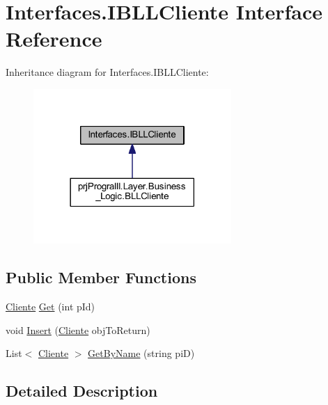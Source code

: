 \hypertarget{interface_interfaces_1_1_i_b_l_l_cliente}{}\section{Interfaces.\+I\+B\+L\+L\+Cliente Interface Reference}
\label{interface_interfaces_1_1_i_b_l_l_cliente}


Inheritance diagram for Interfaces.\+I\+B\+L\+L\+Cliente\+:
\nopagebreak
\begin{figure}[H]
\begin{center}
\leavevmode
\includegraphics[width=213pt]{interface_interfaces_1_1_i_b_l_l_cliente__inherit__graph}
\end{center}
\end{figure}
\subsection*{Public Member Functions}
\begin{DoxyCompactItemize}
\item 
\hyperlink{classprj_progra_i_i_i_1_1_layer_1_1_entities_1_1_cliente}{Cliente} \hyperlink{interface_interfaces_1_1_i_b_l_l_cliente_abebd310b8b290c0d3f35bfc4dc91c708}{Get} (int p\+Id)
\item 
void \hyperlink{interface_interfaces_1_1_i_b_l_l_cliente_aaf2e62f3c57006ecf12ba4559a70448d}{Insert} (\hyperlink{classprj_progra_i_i_i_1_1_layer_1_1_entities_1_1_cliente}{Cliente} obj\+To\+Return)
\item 
List$<$ \hyperlink{classprj_progra_i_i_i_1_1_layer_1_1_entities_1_1_cliente}{Cliente} $>$ \hyperlink{interface_interfaces_1_1_i_b_l_l_cliente_ad54e0142ff9bd0c63164a4bb102eb854}{Get\+By\+Name} (string piD)
\end{DoxyCompactItemize}


\subsection{Detailed Description}


